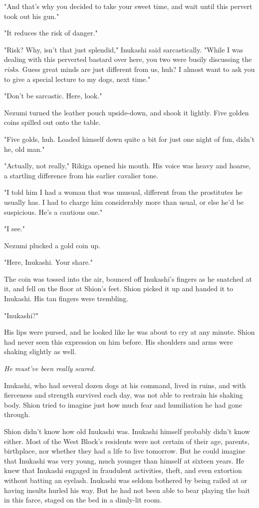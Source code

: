 "And that's why you decided to take your sweet time, and wait until this
pervert took out his gun."

"It reduces the risk of danger."

"Risk? Why, isn't that just splendid," Inukashi said sarcastically.
"While I was dealing with this perverted bastard over here, you two were
busily discussing the \emph{risks}. Guess great minds are just different from
us, huh? I almost want to ask you to give a special lecture to my dogs,
next time."

"Don't be sarcastic. Here, look."

Nezumi turned the leather pouch upside-down, and shook it lightly. Five
golden coins spilled out onto the table.

"Five golds, huh. Loaded himself down quite a bit for just one night of
fun, didn't he, old man."

"Actually, not really," Rikiga opened his mouth. His voice was heavy and
hoarse, a startling difference from his earlier cavalier tone.

"I told him I had a woman that was unusual, different from the
prostitutes he usually has. I had to charge him considerably more than
usual, or else he'd be suspicious. He's a cautious one."

"I see."

Nezumi plucked a gold coin up.

"Here, Inukashi. Your share."

The coin was tossed into the air, bounced off Inukashi's fingers as he
snatched at it, and fell on the floor at Shion's feet. Shion picked it
up and handed it to Inukashi. His tan fingers were trembling.

"Inukashi?"

His lips were pursed, and he looked like he was about to cry at any
minute. Shion had never seen this expression on him before. His
shoulders and arms were shaking slightly as well.

\emph{He must've been really scared.}

Inukashi, who had several dozen dogs at his command, lived in ruins, and
with fierceness and strength survived each day, was not able to restrain
his shaking body. Shion tried to imagine just how much fear and
humiliation he had gone through.

Shion didn't know how old Inukashi was. Inukashi himself probably didn't
know either. Most of the West Block's residents were not certain of
their age, parents, birthplace, nor whether they had a life to live
tomorrow. But he could imagine that Inukashi was very young, much
younger than himself at sixteen years. He knew that Inukashi engaged in
fraudulent activities, theft, and even extortion without batting an
eyelash. Inukashi was seldom bothered by being railed at or having
insults hurled his way. But he had not been able to bear playing the
bait in this farce, staged on the bed in a dimly-lit room.

